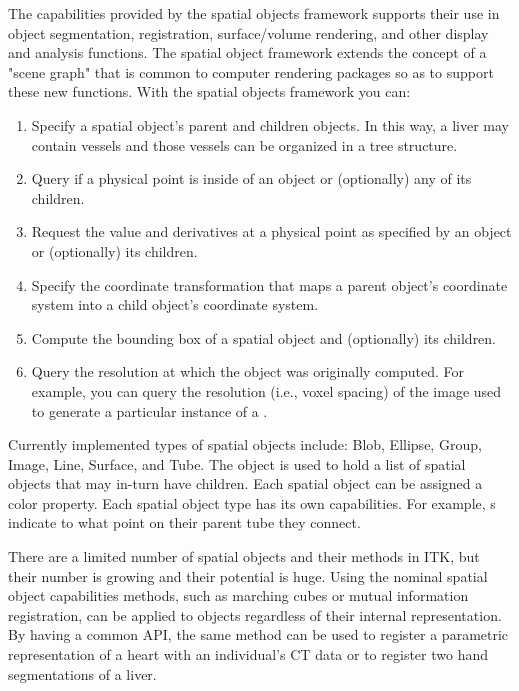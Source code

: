 The capabilities provided by the spatial objects framework supports their use
in object segmentation, registration, surface/volume rendering, and other
display and analysis functions. The spatial object framework extends the
concept of a "scene graph" that is common to computer rendering packages so
as to support these new functions. With the spatial objects framework you
can:
\begin{enumerate}

        \item Specify a spatial object's parent and children objects.  In
        this way, a liver may contain vessels and those vessels can be
        organized in a tree structure.

        \item Query if a physical point is inside of an object or
        (optionally) any of its children.

        \item Request the value and derivatives at a physical point as
        specified by an object or (optionally) its children.

        \item Specify the coordinate transformation that maps a parent
        object's coordinate system into a child object's coordinate system.

        \item Compute the bounding box of a spatial object and (optionally)
        its children.

        \item Query the resolution at which the object was originally
        computed.  For example, you can query the resolution (i.e., voxel
        spacing) of the image used to generate a particular instance of a
        .
\end{enumerate}

Currently implemented types of spatial objects include: Blob, Ellipse, Group,
Image, Line, Surface, and Tube.  The  object is used to hold
a list of spatial objects that may in-turn have children.  Each spatial
object can be assigned a color property.  Each spatial object type has its
own capabilities. For example, s indicate to what
point on their parent tube they connect.

There are a limited number of spatial objects and their methods in ITK, but
their number is growing and their potential is huge. Using the nominal
spatial object capabilities methods, such as marching cubes or mutual
information registration, can be applied to objects regardless of their
internal representation. By having a common API, the same method can be used
to register a parametric representation of a heart with an individual's CT
data or to register two hand segmentations of a liver.

